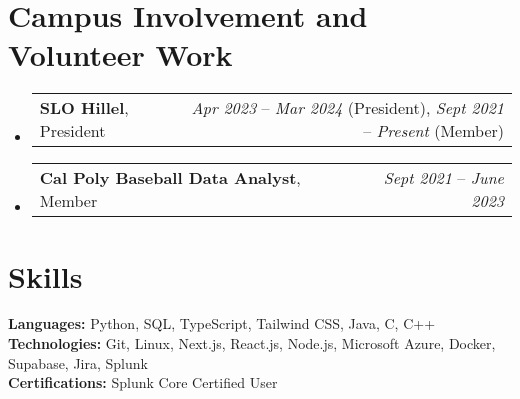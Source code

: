 \documentclass[letterpaper,11pt]{article}
\makeatletter
\newcommand{\resumeCampusInvolvement}[3]{
  \item
    \begin{tabular*}{0.97\textwidth}{l@{\extracolsep{\fill}}r}
      \textbf{#1}, #2 & #3 \\
    \end{tabular*}\vspace{-5pt}
}
\newcommand{\resumeSubHeadingListStart}{\begin{itemize}[leftmargin=*]}
\newcommand{\resumeSubHeadingListEnd}{\end{itemize}}
\makeatother
\begin{document}
\section{Campus Involvement and Volunteer Work}
  \resumeSubHeadingListStart
    \resumeCampusInvolvement{SLO Hillel}{President}{\textit{\small Apr 2023} -- \textit{\small Mar 2024} (President), \textit{\small Sept 2021} -- \textit{\small Present} (Member)}    
    \resumeCampusInvolvement{Cal Poly Baseball Data Analyst}{Member}{\textit{\small Sept 2021} -- \textit{\small June 2023}}
  \resumeSubHeadingListEnd
\section{Skills}

\textbf{Languages:} Python, SQL, TypeScript, Tailwind CSS, Java, C, C++\\
\textbf{Technologies:} Git, Linux, Next.js, React.js, Node.js, Microsoft Azure, Docker, Supabase, Jira, Splunk\\
\textbf{Certifications:} Splunk Core Certified User

\end{document}
